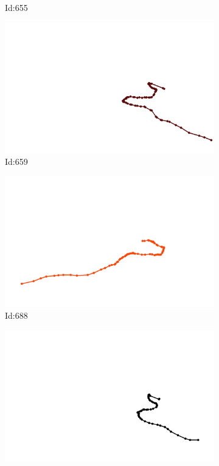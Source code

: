 \documentclass[12pt,twoside]{report}
\begin{document}
\begin{figure}
\begin{subfigure}[b]{0.20\textwidth}
\caption{Id:655}
\end{subfigure}
\begin{subfigure}[b]{0.20\textwidth}
\centering
\includegraphics[width=\textwidth]{../trajectories/659.png}
\caption{Id:659}
\end{subfigure}
\begin{subfigure}[b]{0.20\textwidth}
\centering
\includegraphics[width=\textwidth]{../trajectories/688.png}
\caption{Id:688}
\end{subfigure}
\begin{subfigure}[b]{0.20\textwidth}
\centering
\includegraphics[width=\textwidth]{../trajectories/696.png}

\end{subfigure}
\end{figure}
\end{document}
